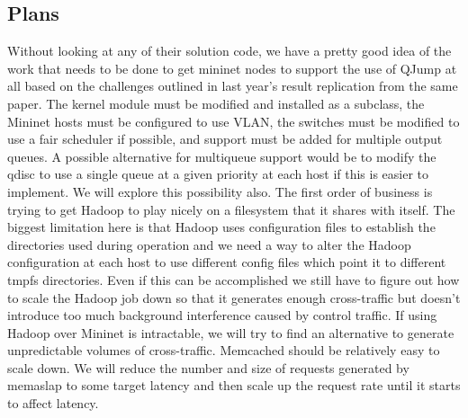 \documentclass[12pt]{article}
\begin{document}
\subsection*{Plans}
	Without looking at any of their solution code, we have a pretty good idea of the work that needs to be done to get mininet nodes to support the use of QJump at all based on the challenges outlined in last year's result replication from the same paper. The kernel module must be modified and installed as a subclass, the Mininet hosts must be configured to use VLAN, the switches must be modified to use a fair scheduler if possible, and support must be added for multiple output queues. A possible alternative for multiqueue support would be to modify the qdisc to use a single queue at a given priority at each host if this is easier to implement. We will explore this possibility also. The first order of business is trying to get Hadoop to play nicely on a filesystem that it shares with itself. The biggest limitation here is that Hadoop uses configuration files to establish the directories used during operation and we need a way to alter the Hadoop configuration at each host to use different config files which point it to different tmpfs directories. Even if this can be accomplished we still have to figure out how to scale the Hadoop job down so that it generates enough cross-traffic but doesn't introduce too much background interference caused by control traffic. If using Hadoop over Mininet is intractable, we will try to find an alternative to generate unpredictable volumes of cross-traffic. Memcached should be relatively easy to scale down. We will reduce the number and size of requests generated by memaslap to some target latency and then scale up the request rate until it starts to affect latency.
		
\end{document}
